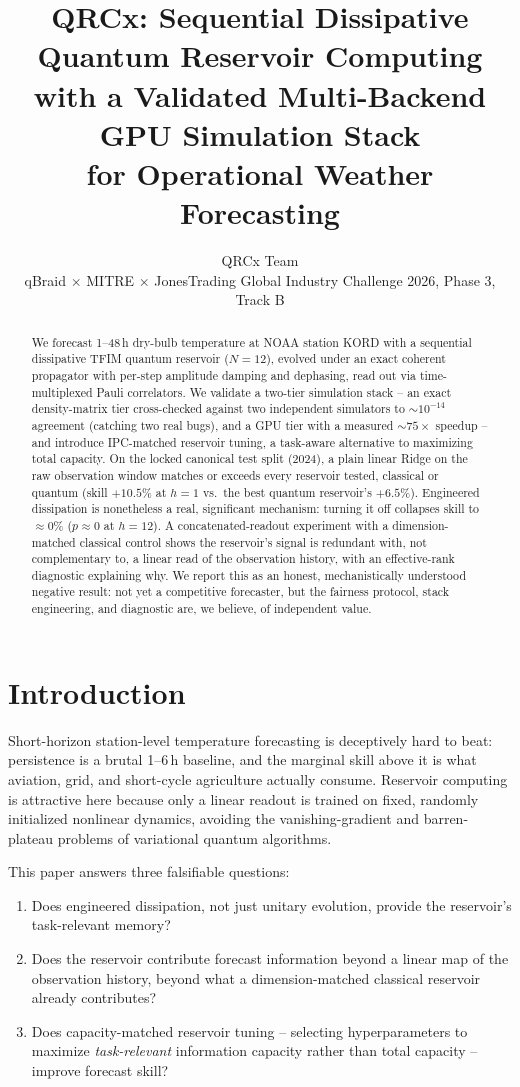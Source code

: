 \documentclass[11pt]{article}
\title{\vspace{-1.5em}QRCx: Sequential Dissipative Quantum Reservoir Computing\\
with a Validated Multi-Backend GPU Simulation Stack\\
for Operational Weather Forecasting}
\author{QRCx Team \\ \small qBraid $\times$ MITRE $\times$ JonesTrading Global Industry Challenge 2026, Phase 3, Track B}
\date{}
\begin{document}
\maketitle
\begin{abstract}
\noindent We forecast 1--48\,h dry-bulb temperature at NOAA station KORD with a sequential
dissipative TFIM quantum reservoir ($N{=}12$), evolved under an exact coherent propagator with
per-step amplitude damping and dephasing, read out via time-multiplexed Pauli correlators. We
validate a two-tier simulation stack -- an exact density-matrix tier cross-checked against two
independent simulators to $\sim\!10^{-14}$ agreement (catching two real bugs), and a GPU tier with
a measured $\sim\!75\times$ speedup -- and introduce IPC-matched reservoir tuning, a task-aware
alternative to maximizing total capacity. On the locked canonical test split (2024), a plain
linear Ridge on the raw observation window matches or exceeds every reservoir tested, classical
or quantum (skill $+10.5\%$ at $h{=}1$ vs.\ the best quantum reservoir's $+6.5\%$). Engineered
dissipation is nonetheless a real, significant mechanism: turning it off collapses skill to
$\approx0\%$ ($p{\approx}0$ at $h{=}12$). A concatenated-readout experiment with a
dimension-matched classical control shows the reservoir's signal is redundant with, not
complementary to, a linear read of the observation history, with an effective-rank diagnostic
explaining why. We report this as an honest, mechanistically understood negative result: not yet a
competitive forecaster, but the fairness protocol, stack engineering, and diagnostic are, we
believe, of independent value.
\end{abstract}

\section{Introduction}

Short-horizon station-level temperature forecasting is deceptively hard to beat: persistence is a
brutal 1--6\,h baseline, and the marginal skill above it is what aviation, grid, and short-cycle
agriculture actually consume. Reservoir computing is attractive here because only a linear readout
is trained on fixed, randomly initialized nonlinear dynamics, avoiding the vanishing-gradient and
barren-plateau problems of variational quantum algorithms.

This paper answers three falsifiable questions:
\begin{enumerate}
\item Does engineered dissipation, not just unitary evolution, provide the reservoir's
  task-relevant memory?
\item Does the reservoir contribute forecast information beyond a linear map of the observation
  history, beyond what a dimension-matched classical reservoir already contributes?
\item Does capacity-matched reservoir tuning -- selecting hyperparameters to maximize
  \emph{task-relevant} information capacity rather than total capacity -- improve forecast skill?
\end{enumerate}
\end{document}
